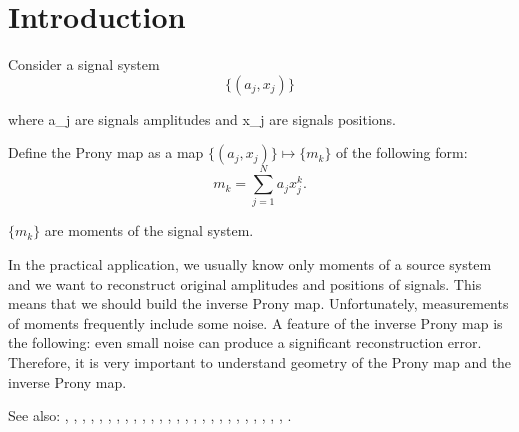 \section{Introduction}
Consider a signal system
$$
\{ (a_j, x_j) \}
$$

where a_j are signals amplitudes and x_j are signals positions. \par

Define the Prony map as a map $\{ (a_j, x_j) \} \mapsto \{m_k\}$ of the following form:
$$
m_k = \sum_{j=1}^N a_j x_j^k.
$$
  
$\{m_k\}$ are moments of the signal system.

In the practical application, we usually know only moments of a source system and we want to reconstruct original amplitudes and positions of signals. This means that we should build the inverse Prony map. Unfortunately, measurements of moments frequently include some noise. A feature of the inverse Prony map is the following: even small noise can produce a significant reconstruction error. Therefore, it is very important to understand geometry of the Prony map and the inverse Prony map.

See also: \cite{2015arXiv150206932A}, \cite{azais_spike}, \cite{batenkov_numerical_2014}, \cite{batenkov_accurate_2014}, \cite{Bat.Sar.Yom}, \cite{Bat.Yom2}, \cite{Bat.Yom.Sampta13}, \cite{Bat.Yom1}, \cite{candes_towards_2014}, \cite{candes_super-resolution_2013}, \cite{demanet_super-resolution_2013}, \cite{donoho_superresolution_1992}, \cite{Don1}, \cite{duval_exact_2013}, \cite{fernandez-granda_support_2013}, \cite{heckel_super-resolution_2014}, \cite{Lev.Ful}, \cite{liao_music_2014}, \cite{McC}, \cite{Min.Kaw.Min}, \cite{moitra_threshold_2014}, \cite{Ode.Bar.Pis}, \cite{Sle}, \cite{Yom2}, \cite{Yom1}, \cite{Dem.Ngu}, \cite{Mor.Can}.
  
  
  
  
  
  
  
  
  